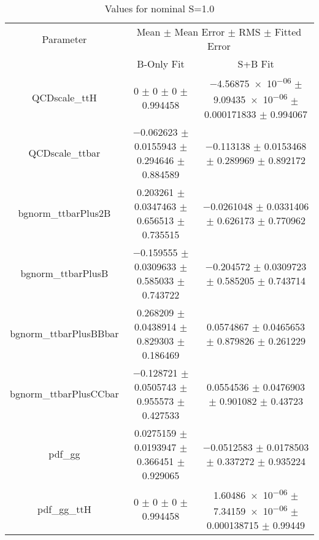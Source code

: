 \begin{table}
\centering
\caption{Values for nominal S=1.0}
\begin{tabular}{ccc}
\toprule
Parameter & \multicolumn{2}{c}{Mean $\pm$ Mean Error $\pm$ RMS $\pm$ Fitted Error}\\
 & B-Only Fit & S+B Fit\\
\midrule
QCDscale\_ttH & \num{0} $\pm$ \num{0} $\pm$ \num{0} $\pm$ \num{0.994458} & \num{-4.56875e-06} $\pm$ \num{9.09435e-06} $\pm$ \num{0.000171833} $\pm$ \num{0.994067}\\
QCDscale\_ttbar & \num{-0.062623} $\pm$ \num{0.0155943} $\pm$ \num{0.294646} $\pm$ \num{0.884589} & \num{-0.113138} $\pm$ \num{0.0153468} $\pm$ \num{0.289969} $\pm$ \num{0.892172}\\
bgnorm\_ttbarPlus2B & \num{0.203261} $\pm$ \num{0.0347463} $\pm$ \num{0.656513} $\pm$ \num{0.735515} & \num{-0.0261048} $\pm$ \num{0.0331406} $\pm$ \num{0.626173} $\pm$ \num{0.770962}\\
bgnorm\_ttbarPlusB & \num{-0.159555} $\pm$ \num{0.0309633} $\pm$ \num{0.585033} $\pm$ \num{0.743722} & \num{-0.204572} $\pm$ \num{0.0309723} $\pm$ \num{0.585205} $\pm$ \num{0.743714}\\
bgnorm\_ttbarPlusBBbar & \num{0.268209} $\pm$ \num{0.0438914} $\pm$ \num{0.829303} $\pm$ \num{0.186469} & \num{0.0574867} $\pm$ \num{0.0465653} $\pm$ \num{0.879826} $\pm$ \num{0.261229}\\
bgnorm\_ttbarPlusCCbar & \num{-0.128721} $\pm$ \num{0.0505743} $\pm$ \num{0.955573} $\pm$ \num{0.427533} & \num{0.0554536} $\pm$ \num{0.0476903} $\pm$ \num{0.901082} $\pm$ \num{0.43723}\\
pdf\_gg & \num{0.0275159} $\pm$ \num{0.0193947} $\pm$ \num{0.366451} $\pm$ \num{0.929065} & \num{-0.0512583} $\pm$ \num{0.0178503} $\pm$ \num{0.337272} $\pm$ \num{0.935224}\\
pdf\_gg\_ttH & \num{0} $\pm$ \num{0} $\pm$ \num{0} $\pm$ \num{0.994458} & \num{1.60486e-06} $\pm$ \num{7.34159e-06} $\pm$ \num{0.000138715} $\pm$ \num{0.99449}\\
\bottomrule
\end{tabular}
\end{table}